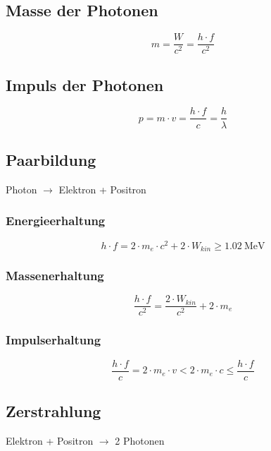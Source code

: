 \subsection{Masse der Photonen}
\begin{equation}\label{eq:photon:masse}
m = \frac{W}{c^2} = \frac{h \cdot f}{c^2}
\end{equation}

\subsection{Impuls der Photonen}
\begin{equation}\label{eq:photon:impuls}
p = m \cdot v = \frac{h \cdot f}{c} = \frac{h}{\lambda}
\end{equation}

\subsection{Paarbildung}
Photon $\rightarrow$ Elektron + Positron

\subsubsection{Energieerhaltung}
\begin{equation}\label{eq:paarbildung:energieerhaltung}
h \cdot f = 2\cdot m_e \cdot c^2 + 2 \cdot W_{kin} \ge
\SI{1.02}{\mega\electronvolt}
\end{equation}

\subsubsection{Massenerhaltung}
\begin{equation}\label{eq:paarbildung:massenerhaltung}
\frac{h\cdot f}{c^2} = \frac{2 \cdot W_{kin}}{c^2} + 2 \cdot m_e
\end{equation}

\subsubsection{Impulserhaltung}
\begin{equation}\label{eq:paarbildung:impulserhaltung}
\frac{h \cdot f}{c} = 2 \cdot m_e \cdot v < 2 \cdot m_e \cdot c \le
\frac{h \cdot f}{c}
\end{equation}

\subsection{Zerstrahlung}
Elektron + Positron $\rightarrow$ 2 Photonen

